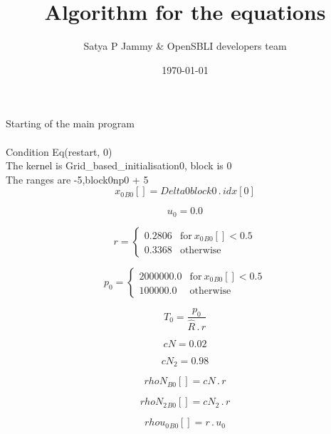 \documentclass{article}
\title{Algorithm for the equations}
\author{Satya P Jammy \& OpenSBLI developers team}
\date{\today}
\begin{document}
\maketitle
\noindent Starting of the main program\\
\\\noindent Condition Eq(restart, 0)\\\noindent The kernel is Grid_based_initialisation0, block is 0\\\noindent The ranges are -5,block0np0 + 5\\\begin{dmath}{x_{0}{_{B0}}}[{}] = Delta0block0 \,.\, {idx}[{0}]\end{dmath}

\begin{dmath}u_{0} = 0.0\end{dmath}

\begin{dmath}r = \begin{cases} 0.2806 & \text{for}\: {x_{0}{_{B0}}}[{}] < 0.5 \\0.3368 & \text{otherwise} \end{cases}\end{dmath}

\begin{dmath}p_{0} = \begin{cases} 2000000.0 & \text{for}\: {x_{0}{_{B0}}}[{}] < 0.5 \\100000.0 & \text{otherwise} \end{cases}\end{dmath}

\begin{dmath}T_{0} = \frac{p_{0}}{\hat{R} \,.\, r}\end{dmath}

\begin{dmath}cN = 0.02\end{dmath}

\begin{dmath}cN_{2} = 0.98\end{dmath}

\begin{dmath}{rhoN{_{B0}}}[{}] = cN \,.\, r\end{dmath}

\begin{dmath}{rhoN_{2}{_{B0}}}[{}] = cN_{2} \,.\, r\end{dmath}

\begin{dmath}{rhou_{0}{_{B0}}}[{}] = r \,.\, u_{0}\end{dmath}
\end{document}
